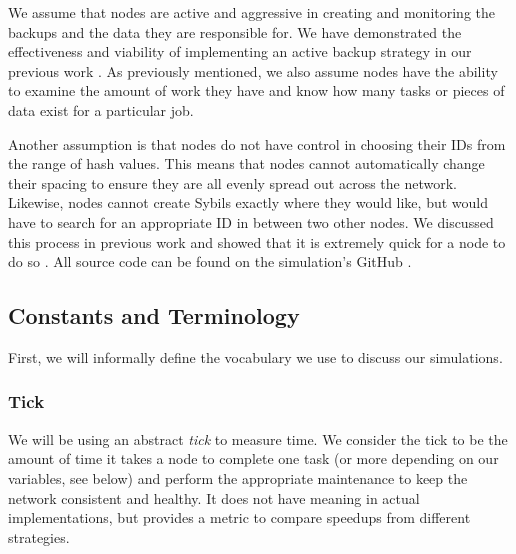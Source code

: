 \documentclass[10pt,conference]{IEEEtran}
\begin{document}
We assume that nodes are active and aggressive in creating and monitoring the backups and the data they are responsible for.
We have demonstrated the effectiveness and viability of implementing an active backup strategy in our previous work \cite{chordreduce}.
As previously mentioned, we also assume nodes have the ability to examine the amount of work they have and know how many tasks or pieces of data exist for a particular job.

Another assumption is that nodes do not have control in choosing their IDs from the range of hash values.
This means that nodes cannot automatically change their spacing to ensure they are all evenly spread out across the network.
Likewise, nodes cannot create Sybils exactly where they would like, but would have to search for an appropriate ID in between two other nodes.
We discussed this process in previous work and showed that it is extremely quick for a node to do so \cite{sybil-analysis}.
All source code can be found on the simulation's GitHub \cite{simulation-source}.




%
%
%


\subsection{Constants and Terminology}

First, we will informally define the vocabulary we use to discuss our simulations.

\subsubsection*{Tick} 
We will be using an abstract \textit{tick} to measure time.  
We consider the tick to be the amount of time it takes a node to complete one task (or more depending on our variables, see below) and perform the appropriate maintenance to keep the network consistent and healthy.
It does not have meaning in actual implementations, but provides a metric to compare speedups from different strategies.
\end{document}
